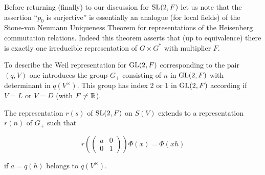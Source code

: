 \begin{remark}
Before returning (finally) to our discussion for $\operatorname{SL}(2,F)$ let us note that the assertion ``$p_0$ is surjective'' is essentially an analogue (for local fields) of the Stone-von Neumann Uniqueness Theorem for representations of the Heisenberg commutation relations. Indeed this theorem asserts that (up to equivalence) there is exactly one irreducible representation of $G \times G^*$ with multiplier $F$.

\end{remark}

To describe the Weil representation for $\operatorname{GL}(2,F)$ corresponding to the pair $(q,V)$ one introduces the group $G_+$ consisting of $n$ in $\operatorname{GL}(2,F)$ with determinant in $q(V^{\times})$. This group has index 2 or 1 in $\operatorname{GL}(2,F)$ according if $V = L$ or $V = D$ (with $F \neq \mathbb{R}$).

\begin{lemma}\label{lem:7.3}

The representation $r(s)$ of $\operatorname{SL}(2,F)$ on $S(V)$ extends to a representation $r(n)$ of $G_+$ such that

\begin{equation}\label{eq:7.13}
r\left(\begin{pmatrix} a & 0 \\ 0 & 1 \end{pmatrix}\right)\Phi(x) = \Phi(xh)\tag{7.13}
\end{equation}

if $a = q(h)$ belongs to $q(V^{\times})$.

\end{lemma}

